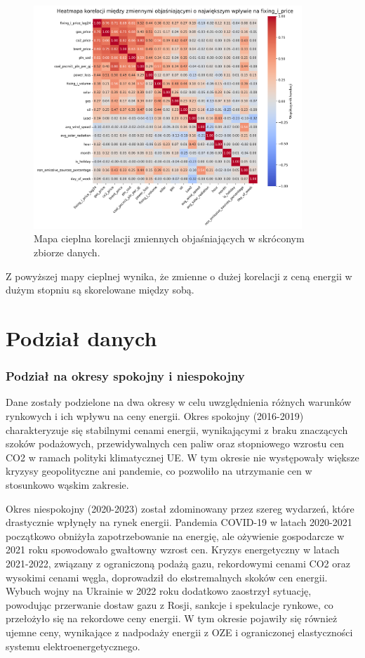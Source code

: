 \begin{figure}[H]
    \centering
    \includegraphics[width=0.9\textwidth]{../plots/heatmap_short_db_features.png}
    \caption{Mapa cieplna korelacji zmiennych objaśniających w skróconym zbiorze danych.}
    \label{fig:heatmap_shortened_dataset}
\end{figure}

Z powyższej mapy cieplnej wynika, że zmienne o dużej korelacji z ceną energii w dużym stopniu są skorelowane między sobą. 

\section{Podział danych}

\subsubsection{Podział na okresy spokojny i niespokojny}

Dane zostały podzielone na dwa okresy w celu uwzględnienia różnych warunków rynkowych i ich wpływu na ceny energii. Okres spokojny (2016-2019) charakteryzuje się stabilnymi cenami energii, wynikającymi z braku znaczących szoków podażowych, przewidywalnych cen paliw oraz stopniowego wzrostu cen CO2 w ramach polityki klimatycznej UE. W tym okresie nie występowały większe kryzysy geopolityczne ani pandemie, co pozwoliło na utrzymanie cen w stosunkowo wąskim zakresie.

Okres niespokojny (2020-2023) został zdominowany przez szereg wydarzeń, które drastycznie wpłynęły na rynek energii. Pandemia COVID-19 w latach 2020-2021 początkowo obniżyła zapotrzebowanie na energię, ale ożywienie gospodarcze w 2021 roku spowodowało gwałtowny wzrost cen. Kryzys energetyczny w latach 2021-2022, związany z ograniczoną podażą gazu, rekordowymi cenami CO2 oraz wysokimi cenami węgla, doprowadził do ekstremalnych skoków cen energii. Wybuch wojny na Ukrainie w 2022 roku dodatkowo zaostrzył sytuację, powodując przerwanie dostaw gazu z Rosji, sankcje i spekulacje rynkowe, co przełożyło się na rekordowe ceny energii. W tym okresie pojawiły się również ujemne ceny, wynikające z nadpodaży energii z OZE i ograniczonej elastyczności systemu elektroenergetycznego.

